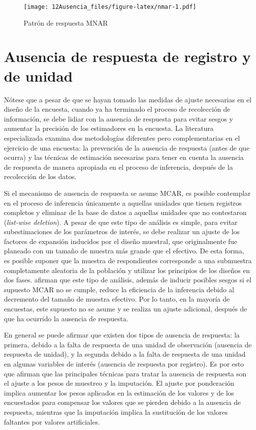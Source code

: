 \documentclass[
  12pt,
]{book}
\begin{document}
\begin{figure}
\centering
\texttt{[image: 12Ausencia\_files/figure-latex/nmar-1.pdf]}
\caption{\label{fig:nmar}Patrón de respuesta MNAR}
\end{figure}

\hypertarget{ausencia-de-respuesta-de-registro-y-de-unidad}{%
\section{Ausencia de respuesta de registro y de unidad}\label{ausencia-de-respuesta-de-registro-y-de-unidad}}

Nótese que a pesar de que se hayan tomado las medidas de ajuste necesarias en el diseño de la encuesta, cuando ya ha terminado el proceso de recolección de información, se debe lidiar con la ausencia de respuesta para evitar sesgos y aumentar la precisión de los estimadores en la encuesta. La literatura especializada examina dos metodologías diferentes pero complementarias en el ejercicio de una encuesta: la prevención de la ausencia de respuesta (antes de que ocurra) y las técnicas de estimación necesarias para tener en cuenta la ausencia de respuesta de manera apropiada en el proceso de inferencia, después de la recolección de los datos.

Si el mecanismo de ausencia de respuesta se asume MCAR, es posible contemplar en el proceso de inferencia únicamente a aquellas unidades que tienen registros completos y eliminar de la base de datos a aquellas unidades que no contestaron (\emph{list-wise deletion}). A pesar de que este tipo de análisis es simple, para evitar subestimaciones de los parámetros de interés, se debe realizar un ajuste de los factores de expansión inducidos por el diseño muestral, que originalmente fue planeado con un tamaño de muestra más grande que el efectivo. De esta forma, es posible suponer que la muestra de respondientes corresponde a una submuestra completamente aleatoria de la población y utilizar los principios de los diseños en dos fases. \citet[capítulo 11]{Heeringa_West_Berglund_2010} afirman que este tipo de análisis, además de inducir posibles sesgos si el supuesto MCAR no se cumple, reduce la eficiencia de la inferencia debido al decremento del tamaño de muestra efectivo. Por lo tanto, en la mayoría de encuestas, este supuesto no se asume y se realiza un ajuste adicional, después de que ha ocurrido la ausencia de respuesta.

En general se puede afirmar que existen dos tipos de ausencia de respuesta: la primera, debido a la falta de respuesta de una unidad de observación (ausencia de respuesta de unidad), y la segunda debido a la falta de respuesta de una unidad en algunas variables de interés (ausencia de respuesta por registro). Es por esto que \citet[sección 15.5]{Sarndal_Swensson_Wretman_2003} afirman que las principales técnicas para tratar la ausencia de respuesta son el ajuste a los pesos de muestreo y la imputación. El ajuste por ponderación implica aumentar los pesos aplicados en la estimación de los valores y de los encuestados para compensar los valores que se pierden debido a la ausencia de respuesta, mientras que la imputación implica la sustitución de los valores faltantes por valores artificiales.
\end{document}
